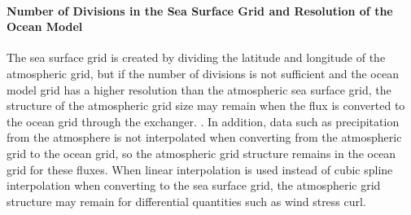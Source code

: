 \hypertarget{number-of-divisions-in-the-sea-surface-grid-and-resolution-of-the-ocean-model}{%
\paragraph{Number of Divisions in the Sea Surface Grid and Resolution of
the Ocean
Model}\label{number-of-divisions-in-the-sea-surface-grid-and-resolution-of-the-ocean-model}}

The sea surface grid is created by dividing the latitude and longitude
of the atmospheric grid, but if the number of divisions is not
sufficient and the ocean model grid has a higher resolution than the
atmospheric sea surface grid, the structure of the atmospheric grid size
may remain when the flux is converted to the ocean grid through the
exchanger. . In addition, data such as precipitation from the atmosphere
is not interpolated when converting from the atmospheric grid to the
ocean grid, so the atmospheric grid structure remains in the ocean grid
for these fluxes. When linear interpolation is used instead of cubic
spline interpolation when converting to the sea surface grid, the
atmospheric grid structure may remain for differential quantities such
as wind stress curl.
